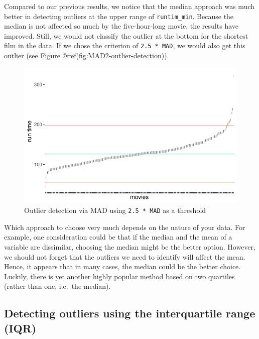 \documentclass[
  letterpaper,
]{krantz}
\begin{document}
Compared to our previous results, we notice that the median approach was
much better in detecting outliers at the upper range of
\texttt{runtim\_min}. Because the median is not affected so much by the
five-hour-long movie, the results have improved. Still, we would not
classify the outlier at the bottom for the shortest film in the data. If
we chose the criterion of \texttt{2.5\ *\ MAD}, we would also get this
outlier (see Figure @ref(fig:MAD2-outlier-detection)).

\begin{figure}[H]

{\centering \includegraphics{09_sources_of_bias_files/figure-pdf/MAD2-outlier-detection-1.pdf}

}

\caption{Outlier detection via MAD using \texttt{2.5\ *\ MAD} as a
threshold}

\end{figure}%

Which approach to choose very much depends on the nature of your data.
For example, one consideration could be that if the median and the mean
of a variable are dissimilar, choosing the median might be the better
option. However, we should not forget that the outliers we need to
identify will affect the mean. Hence, it appears that in many cases, the
median could be the better choice. Luckily, there is yet another highly
popular method based on two quartiles (rather than one, i.e.~the
median).

\subsection{Detecting outliers using the interquartile range
(IQR)}\label{outliers-iqr}
\end{document}
